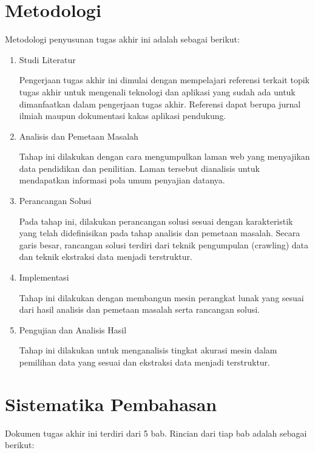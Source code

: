 \section{Metodologi}

Metodologi penyusunan tugas akhir ini adalah sebagai berikut:

\begin{enumerate}
    \item Studi Literatur

    Pengerjaan tugas akhir ini dimulai dengan mempelajari referensi terkait topik tugas akhir untuk mengenali teknologi dan aplikasi yang sudah ada untuk dimanfaatkan dalam pengerjaan tugas akhir. Referensi dapat berupa jurnal ilmiah maupun dokumentasi kakas aplikasi pendukung.

    \item Analisis dan Pemetaan Masalah

    Tahap ini dilakukan dengan cara mengumpulkan laman web yang menyajikan data pendidikan dan penilitian. Laman tersebut dianalisis untuk mendapatkan informasi pola umum penyajian datanya.

    \item Perancangan Solusi

    Pada tahap ini, dilakukan perancangan solusi sesuai dengan karakteristik yang telah didefinisikan pada tahap analisis dan pemetaan masalah. Secara garis besar, rancangan solusi terdiri dari teknik pengumpulan (crawling) data dan teknik ekstraksi data menjadi terstruktur.

    \item Implementasi

    Tahap ini dilakukan dengan membangun mesin perangkat lunak yang sesuai dari hasil analisis dan pemetaan masalah serta rancangan solusi.

    \item Pengujian dan Analisis Hasil

    Tahap ini dilakukan untuk menganalisis tingkat akurasi mesin dalam pemilihan data yang sesuai dan ekstraksi data menjadi terstruktur.
\end{enumerate}

\section{Sistematika Pembahasan}

Dokumen tugas akhir ini terdiri dari 5 bab. Rincian dari tiap bab adalah sebagai berikut:

